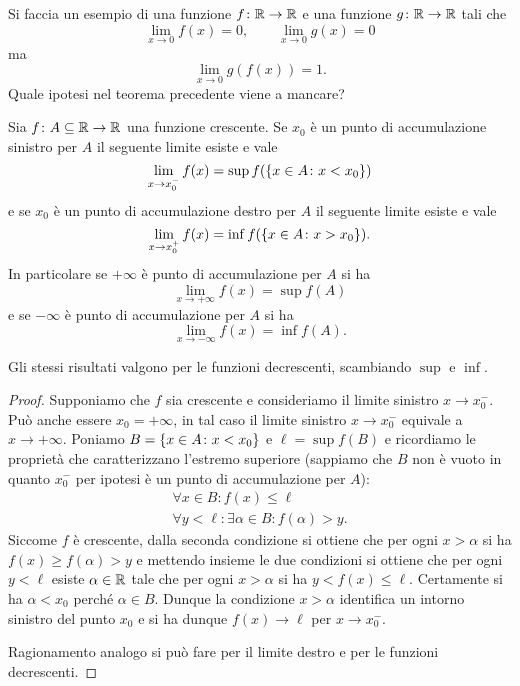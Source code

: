\begin{exercise}
  Si faccia un esempio di una funzione $f\colon{\mathbb R}\to {\mathbb R}$ 
  e una funzione $g\colon{\mathbb R}\to {\mathbb R}$ tali che 
  \[
  \lim_{x\to 0} f(x) = 0, \qquad 
  \lim_{x\to 0} g(x) = 0
  \]
  ma
  \[
  \lim_{x\to 0} g(f(x)) = 1.
  \]
  Quale ipotesi nel teorema precedente viene a mancare?
\end{exercise}

\begin{theorem}%
  \mymark{**}%
  \label{th:limite_monotona}%
Sia $f\colon A \subseteq {\mathbb R} \to {\mathbb R}$ una funzione crescente. 
Se $x_0$ è un punto di accumulazione sinistro per $A$ 
il seguente limite esiste e vale
\[
   \lim_{x\to x_0^-}f(x) = \sup f({\left\{ x\in A\colon x<x_0 \right\}})
\]
e se $x_0$ è un punto di accumulazione destro per $A$ 
il seguente limite esiste e vale
\[
   \lim_{x\to x_0^+} f(x) = \inf f({\left\{ x\in A\colon x>x_0 \right\}}).
\]
In particolare se $+\infty$ è punto di accumulazione per $A$ 
si ha 
\[
  \lim_{x\to +\infty} f(x) = \sup f(A)
\]
e se $-\infty$ è punto di accumulazione per $A$ si ha 
\[
  \lim_{x\to -\infty} f(x) = \inf f(A).
\]

Gli stessi risultati valgono per le funzioni decrescenti, 
scambiando $\sup$ e $\inf$.
\end{theorem}
%
\begin{proof}\mymark{**}
Supponiamo che $f$ sia crescente e consideriamo il limite 
sinistro $x\to x_0^-$. Può anche essere $x_0=+\infty$, in tal 
caso il limite sinistro $x\to x_0^-$ equivale a $x\to +\infty$.
Poniamo $B={\left\{ x\in A\colon x<x_0 \right\}}$
e $\ell=\sup f(B)$ e ricordiamo le proprietà che caratterizzano 
l'estremo superiore
(sappiamo che $B$ non è vuoto in quanto $x_0^-$ per ipotesi 
è un punto di accumulazione per $A$):
\begin{gather*}
  \forall x \in B \colon f(x) \le \ell \\
  \forall y < \ell \colon \exists \alpha \in B \colon f(\alpha) > y.
\end{gather*}
Siccome $f$ è crescente, dalla seconda condizione 
si ottiene che per ogni $x>\alpha$ si ha $f(x)\ge f(\alpha)> y$
e mettendo insieme le due condizioni si ottiene che per ogni $y<\ell$
esiste $\alpha\in{\mathbb R}$ tale che per ogni $x>\alpha$ si ha $y<f(x)\le \ell$.
Certamente si ha $\alpha < x_0$ perché $\alpha\in B$.   
Dunque la condizione $x>\alpha$ identifica un intorno sinistro 
del punto $x_0$ e si ha dunque $f(x)\to \ell$ per $x\to x_0^-$.

Ragionamento analogo si può fare per il limite destro  
e per le funzioni decrescenti.
\end{proof}

